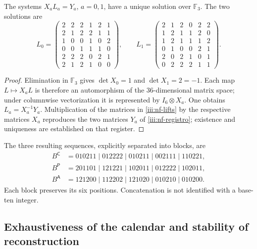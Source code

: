 \begin{proposition}
\label{iii:nf-unicidad}
The systems $X_aL_a=Y_a$, $a=0,1$, have a unique solution over
$\mathbb F_3$. The two solutions are
\begingroup\small
\begin{equation}
L_0=\begin{pmatrix}
2&2&2&1&2&1\\2&1&2&2&1&1\\1&0&0&1&0&2\\
0&0&1&1&1&0\\2&2&2&0&2&1\\2&1&2&1&0&0
\end{pmatrix},\qquad
L_1=\begin{pmatrix}
2&1&2&0&2&2\\1&2&1&1&2&0\\1&2&1&1&1&2\\
0&1&0&0&2&1\\2&0&2&1&0&1\\0&2&2&2&1&1
\end{pmatrix}.
\label{iii:nf-lifts}
\end{equation}
\endgroup
\end{proposition}

\begin{proof}
Elimination in $\mathbb F_3$ gives $\det X_0=1$ and
$\det X_1=2=-1$. Each map $L\mapsto X_aL$ is therefore
an automorphism of the $36$-dimensional matrix space; under columnwise
vectorization it is represented by $I_6\otimes X_a$.
One obtains $L_a=X_a^{-1}Y_a$. Multiplication of the matrices in
\eqref{iii:nf-lifts} by the respective matrices $X_a$ reproduces the
two matrices $Y_a$ of \eqref{iii:nf-registro}; existence and uniqueness
are established on that register.
\end{proof}

The three resulting sequences, explicitly separated into blocks,
are
\begin{align*}
 B^{\mathsf C}&=010211\mid012222\mid010211\mid002111\mid110221,\\
 B^{\mathsf P}&=201101\mid121221\mid102011\mid012222\mid102011,\\
 B^{\mathsf A}&=121200\mid112202\mid121020\mid010210\mid010200.
\end{align*}
Each block preserves its six positions. Concatenation is not
identified with a base-ten integer.

\subsection{Exhaustiveness of the calendar and stability of reconstruction}

